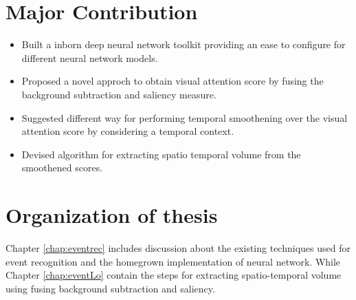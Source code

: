 \section{Major Contribution}
\begin{itemize}
	\item{Built a inborn deep neural network toolkit providing an ease to configure for different neural network models.}
	\item{Proposed a novel approch to obtain visual attention score by fusing the background subtraction and saliency measure.}
	\item{Suggested different way for performing temporal smoothening over the visual attention score by considering a temporal context.}
	\item{Devised algorithm for extracting spatio temporal volume from the smoothened scores.}
\end{itemize}

\section{Organization of thesis}
\par Chapter \ref{chap:eventrec} includes discussion about the existing techniques used for event recognition and the homegrown implementation of neural network. While Chapter \ref{chap:eventLo} contain the steps for extracting spatio-temporal volume using fusing background subtraction and saliency.
